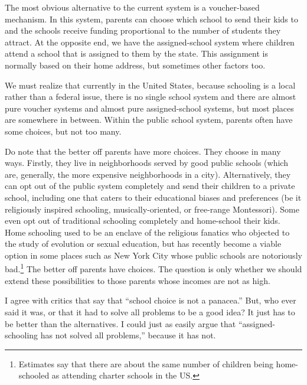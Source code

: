 The most obvious alternative to the current system is a voucher-based
mechanism. In this system, parents can choose which school to send their kids
to and the schools receive funding proportional to the number of students they
attract. At the opposite end, we have the assigned-school system where children
attend a school that is assigned to them by the state. This assignment is
normally based on their home address, but sometimes other factors too.

We must realize that currently in the United States, because schooling is a
local rather than a federal issue, there is no single school system and there
are almost pure voucher systems and almost pure assigned-school systems, but
most places are somewhere in between. Within the public school system, parents
often have some choices, but not too many.

Do note that the better off parents have more choices. They choose in many
ways. Firstly, they live in neighborhoods served by good public schools (which
are, generally, the more expensive neighborhoods in a city). Alternatively,
they can opt out of the public system completely and send their children to a
private school, including one that caters to their educational biases and
preferences (be it religiously inspired schooling, musically-oriented, or
free-range Montessori). Some even opt out of traditional schooling completely
and home-school their kids. Home schooling used to be an enclave of the
religious fanatics who objected to the study of evolution or sexual education,
but has recently become a viable option in some places such as New York City
whose public schools are notoriously bad.\footnote{Estimates
say that there are about the same number of children being home-schooled as
attending charter schools in the US.}
The better off parents have choices. The question is only whether we should
extend these possibilities to those parents whose incomes are not as high.

I agree with critics that say that ``school choice is not a panacea.'' But, who
ever said it was, or that it had to solve all problems to be a good idea? It
just has to be better than the alternatives. I could just as easily argue that
``assigned-schooling has not solved all problems,'' because it has not.

